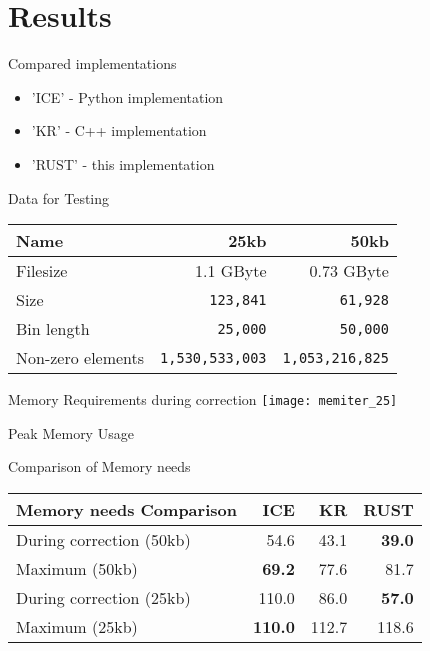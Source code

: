


\section{Results}


\begin{frame}[c]{Compared implementations}
    \begin{itemize}[<+(1)->]
        \item 'ICE' - Python implementation
        \item 'KR' - C++ implementation
        \item 'RUST' - this implementation
    \end{itemize}
\end{frame}



\begin{frame}[c,fragile]{Data for Testing}
    \normalsize
    \begin{tabular}{@{}lrr@{}}
        \textbf{Name}       & 25kb          & 50kb \\
        \hline
        Filesize            & 1.1 GByte     & 0.73 GByte     \\
        Size                & \verb|123,841|       & \verb|61,928| \\
        Bin length          & \verb|25,000|        & \verb|50,000| \\
        Non-zero elements   & \verb|1,530,533,003| & \verb|1,053,216,825| \\
    \end{tabular}
\end{frame}




\begin{frame}[c]{Memory Requirements during correction}
    \texttt{[image: memiter\_25]}
\end{frame}


\begin{frame}[c]{Peak Memory Usage}
\end{frame}

\begin{frame}[c]{Comparison of Memory needs}
    \begin{tabular}{lrrr}
        \textbf{Memory needs Comparison} & ICE & KR & RUST \\
        \hline
        During correction (50kb) &   54.6 & 43.1 & \textbf{39.0}   \\
        Maximum          (50kb) &   \textbf{69.2} & 77.6 & 81.7 \\
        During correction (25kb) &   110.0 & 86.0 & \textbf{57.0}  \\
        Maximum          (25kb) &   \textbf{110.0} & 112.7 & 118.6 \\
    \end{tabular}
\end{frame}


